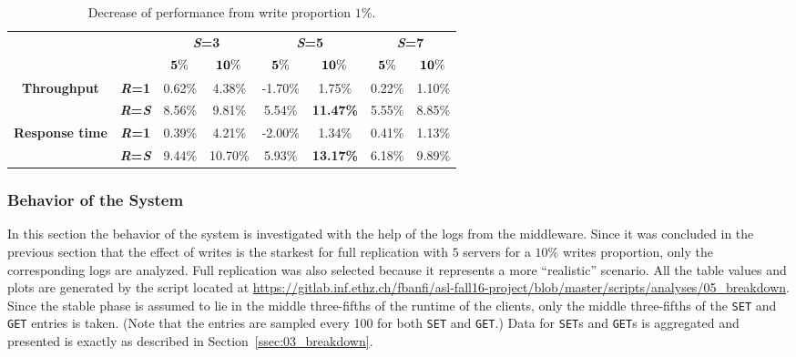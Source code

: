 \documentclass[11pt]{article}
\theoremstyle{definition}
\renewcommand\b[1]{{\bf{#1}}}
\renewcommand\t\texttt
\begin{document}
\begin{table}[h]
    \centering
    \small
    {
        \begin{tabular}{|c|c||c|c||c|c||c|c|}
            \cline{3-8}
            \multicolumn{2}{c|}{} & \multicolumn{2}{c||}{\b{\textit S=3}} & \multicolumn{2}{c||}{\b{\textit S=5}} & \multicolumn{2}{c|}{\b{\textit S=7}} \\ 
            \cline{3-8}
            \multicolumn{2}{c|}{} & $\bf 5\%$ & $\bf 10\%$ & $\bf 5\%$ & $\bf 10\%$ & $\bf 5\%$ & $\bf 10\%$ \\
            \hline
            \hline
            \multirow{2}{*}{\bf Throughput} & {\b{\textit R=1}} & 0.62\% & 4.38\% & -1.70\% & 1.75\% & 0.22\% & 1.10\% \\
            \cline{2-8}
            & {\b{\textit R=\textit S}} & 8.56\% & 9.81\% & 5.54\% & \b{11.47\%} & 5.55\% & 8.85\% \\
            \hline
            \hline
            \multirow{2}{*}{\bf Response time} & {\b{\textit R=1}} & 0.39\% & 4.21\% & -2.00\% & 1.34\% & 0.41\% & 1.13\% \\
            \cline{2-8}
            & {\b{\textit R=\textit S}} & 9.44\% & 10.70\% & 5.93\% & \b{13.17\%} & 6.18\% & 9.89\% \\
            \hline
        \end{tabular}
    }
    \caption{Decrease of performance from write proportion $1\%$.}
    \label{tab:ex3ratios}
\end{table}

\subsubsection{Behavior of the System}

In this section the behavior of the system is investigated with the help of the logs from the middleware.
Since it was concluded in the previous section that the effect of writes is the starkest for full replication with $5$ servers for a $10\%$ writes proportion, only the corresponding logs are analyzed.
Full replication was also selected because it represents a more ``realistic'' scenario.
All the table values and plots are generated by the script located at \url{https://gitlab.inf.ethz.ch/fbanfi/asl-fall16-project/blob/master/scripts/analyses/05_breakdown}.
Since the stable phase is assumed to lie in the middle three-fifths of the runtime of the clients, only the middle three-fifths of the \t{SET} and \t{GET} entries is taken.
(Note that the entries are sampled every 100 for both \t{SET} and \t{GET}.)
Data for \t{SET}s and \t{GET}s is aggregated and presented is exactly as described in Section~\ref{ssec:03_breakdown}.
\end{document}
